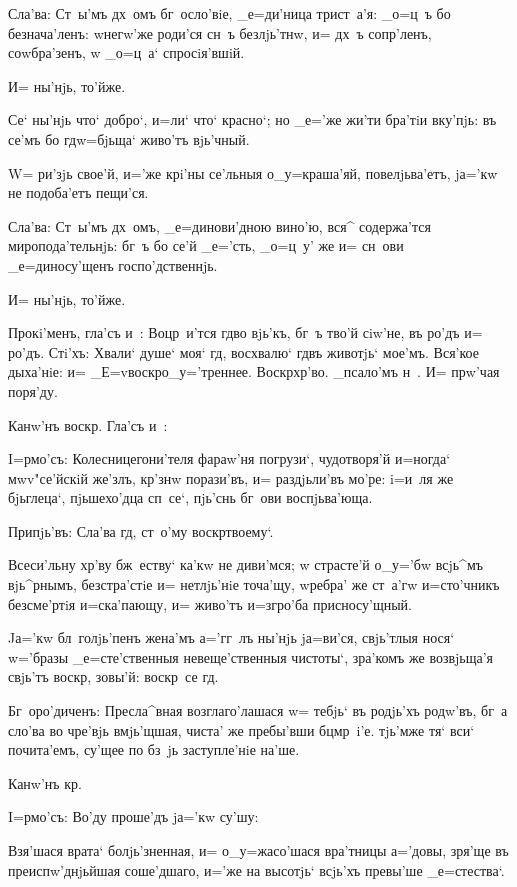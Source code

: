 Сла'ва: Ст~ы'мъ дх~омъ бг~осло'вiе, _е=ди'ница 
трист~а'я: _о=ц~ъ бо безнача'ленъ: w\т негw'же роди'ся 
сн~ъ безлjь'тнw, и= дх~ъ сопр'ленъ, соwбра'зенъ, w\т 
_о=ц~а` спросiя'вшiй.

И= ны'нjь, то'йже.


Се` ны'нjь что` добро`, и=ли` что` красно`; но _е='же 
жи'ти бра'тiи вку'пjь: въ се'мъ бо гд w=бjьща` живо'тъ 
вjь'чный.

W= ри'зjь свое'й, и='же крi'ны се'льныя о_у=краша'яй, 
повелjьва'етъ, jа='кw не подоба'етъ пещи'ся.

Сла'ва: Ст~ы'мъ дх~омъ, _е=динови'дною вино'ю, вся^ 
содержа'тся миропода'тельнjь: бг~ъ бо се'й _е='сть, 
_о=ц~у' же и= сн~ови _е=диносу'щенъ госпо'дственнjь.

И= ны'нjь, то'йже.

Прокi'менъ, гла'съ и~: Воцр~и'тся гд во вjь'къ, 
бг~ъ тво'й сiw'не, въ ро'дъ и= ро'дъ. Стi'хъ: Хвали` 
душе` моя` гд, восхвалю` гд въ животjь` мое'мъ. 
Вся'кое дыха'нiе: и= _Е=v воскр о_у='треннее. 
Воскр хр'во. _псало'мъ н~. И= прw'чая поря'ду.

Канw'нъ воскр. Гла'съ и~:


I=рмо'съ: Колесницегони'теля фараw'ня погрузи`, 
чудотворя'й и=ногда` мwv"се'йскiй же'злъ, кр'знw 
порази'въ, и= раздjьли'въ мо'ре: i=и~ля же бjьглеца`, 
пjьшехо'дца сп~се`, пjь'снь бг~ови воспjьва'юща.

Припjь'въ: Сла'ва гд, ст~о'му воскр твоему`.

Всеси'льну хр'ву бж~еству` ка'кw не диви'мся; w\т 
страсте'й о_у='бw всjь^мъ вjь^рнымъ, безстра'стiе и= 
нетлjь'нiе точа'щу, w\т ребра' же ст~а'гw и=сто'чникъ 
безсме'ртiя и=ска'пающу, и= живо'тъ и=з\ъ гро'ба 
присносу'щный.

Jа='кw бл~голjь'пенъ жена'мъ а='гг~лъ ны'нjь jа=ви'ся, 
свjь'тлыя нося` w='бразы _е=сте'ственныя невеще'ственныя 
чистоты`, зра'комъ же возвjьща'я свjь'тъ воскр, 
зовы'й: воскр~се гд.

Бг~оро'диченъ: Пресла^вная возглаго'лашася w= тебjь` 
въ родjь'хъ родw'въ, бг~а сло'ва во чре'вjь вмjь'щшая, 
чиста' же пребы'вши бц мр~i'е. тjь'мже тя` вси` 
почита'емъ, су'щее по бз~jь заступле'нiе на'ше.

Канw'нъ кр.

I=рмо'съ: Во'ду проше'дъ jа='кw су'шу:

Взя'шася врата` болjь'зненная, и= о_у=жасо'шася 
вра'тницы а='довы, зря'ще въ преиспw'днjьйшая соше'дшаго, 
и='же на высотjь` всjь'хъ превы'ше _е=стества`.


